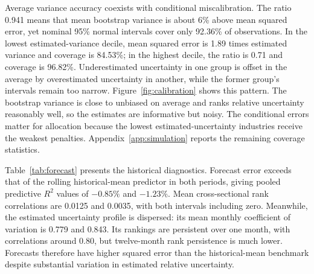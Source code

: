 Average variance accuracy coexists with conditional miscalibration. The ratio 0.941 means that mean bootstrap variance is about 6\% above mean squared error, yet nominal 95\% normal intervals cover only 92.36\% of observations. In the lowest estimated-variance decile, mean squared error is 1.89 times estimated variance and coverage is 84.53\%; in the highest decile, the ratio is 0.71 and coverage is 96.82\%. Underestimated uncertainty in one group is offset in the average by overestimated uncertainty in another, while the former group's intervals remain too narrow. Figure~\ref{fig:calibration} shows this pattern. The bootstrap variance is close to unbiased on average and ranks relative uncertainty reasonably well, so the estimates are informative but noisy. The conditional errors matter for allocation because the lowest estimated-uncertainty industries receive the weakest penalties. Appendix~\ref{app:simulation} reports the remaining coverage statistics.

Table~\ref{tab:forecast} presents the historical diagnostics. Forecast error exceeds that of the rolling historical-mean predictor in both periods, giving pooled predictive $R^2$ values of $-0.85\%$ and $-1.23\%$. Mean cross-sectional rank correlations are 0.0125 and 0.0035, with both intervals including zero. Meanwhile, the estimated uncertainty profile is dispersed: its mean monthly coefficient of variation is 0.779 and 0.843. Its rankings are persistent over one month, with correlations around 0.80, but twelve-month rank persistence is much lower. Forecasts therefore have higher squared error than the historical-mean benchmark despite substantial variation in estimated relative uncertainty.


\FloatBarrier
